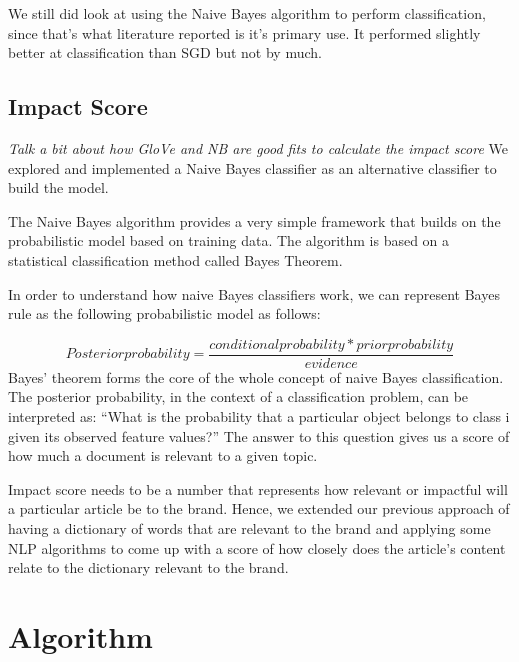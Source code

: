 \documentclass{article}
\begin{document}
We still did look at using the Naive Bayes algorithm to perform classification, since that's what literature reported is it's primary use. It performed slightly better at classification than SGD but not by much.

\subsection {Impact Score}

\textit{Talk a bit about how GloVe and NB are good fits to calculate the impact score}
We explored and implemented a Naive Bayes classifier as an alternative classifier to build the model.

The Naive Bayes algorithm provides a very simple framework that builds on the probabilistic model based on training data.
The algorithm is based on a statistical classification method called Bayes Theorem.

In order to understand how naive Bayes classifiers work, we can represent Bayes rule as the following probabilistic model as follows:

\[Posteriorprobability = \frac{conditionalprobability * priorprobability}{evidence}\]
Bayes’ theorem forms the core of the whole concept of naive Bayes classification. The posterior probability, in the context of a classification problem, can be interpreted as: “What is the probability that a particular object belongs to class i given its observed feature values?” The answer to this question gives us a score of how much a document is relevant to a given topic.


Impact score needs to be a number that represents how relevant or impactful will a particular article be to the brand. Hence, we extended our previous approach of having a dictionary of words that are relevant to the brand and applying some NLP algorithms to come up with a score of how closely does the article's content relate to the dictionary relevant to the brand.

\maketitle
\section {Algorithm}
\end{document}
